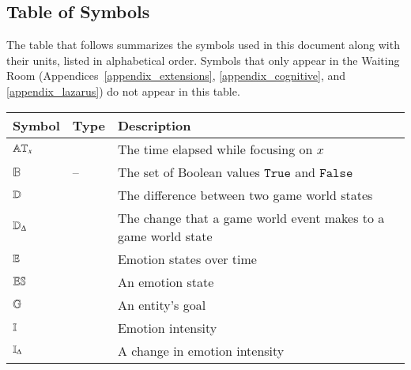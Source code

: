 \subsection{Table of Symbols}

The table that follows summarizes the symbols used in this document along with
their units, listed in alphabetical order. Symbols that only appear in the
Waiting Room (Appendices~\ref{appendix_extensions}, \ref{appendix_cognitive},
and \ref{appendix_lazarus}) do not appear in this table.

\noindent \begin{center}
    \renewcommand{\arraystretch}{1.2}
    \begin{longtable*}{C{0.1\textwidth} C{0.1\textwidth}
            m{0.7\textwidth}} \toprule
        \textbf{Symbol} & \textbf{Type} & \textbf{Description}\\
        \midrule

        $\mathbb{AT}_x$ &  & The time
        elapsed while focusing on $x$ \\

        $\mathbb{B}$ & -- & The set of Boolean values $\mathtt{True}$ and
        $\mathtt{False}$ \\

        $\mathbb{D}$ &
         & The difference between two game
        world states \\

        $\mathbb{D}_{\Delta}$ &
         & The change that a game
        world event makes to a game world state \\

        $\mathbb{E}$ &  & Emotion
        states over time \\

        $\mathbb{ES}$ &  & An emotion state \\

        $\mathbb{G}$ &  & An entity's goal \\

        $\mathbb{I}$ &  & Emotion
        intensity \\

        $\mathbb{I}_{\Delta}$ &  & A
        change in emotion intensity \\


\end{longtable*}
\end{center}
